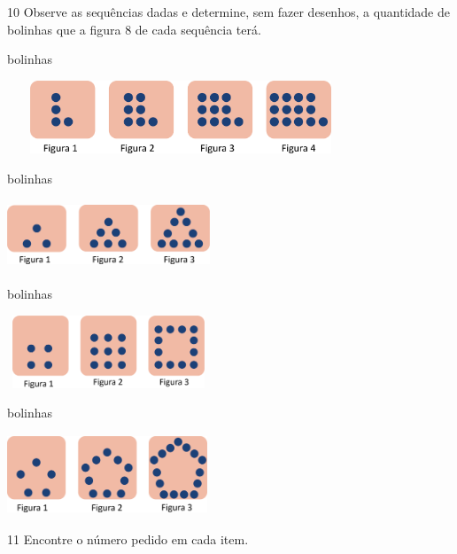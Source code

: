 \num{10} Observe as sequências dadas e determine, sem fazer desenhos, a
quantidade de bolinhas que a figura 8 de cada sequência terá.


\begin{escolha}
\item {} bolinhas

\includegraphics[width=4.09202in,height=0.85841in]{media/image32.png}

\item {} bolinhas

\includegraphics[width=2.38354in,height=0.81674in]{media/image33.png}

\item {} bolinhas

\includegraphics[width=2.38354in,height=0.85007in]{media/image34.png}

\item {} bolinhas

\includegraphics[width=2.35854in,height=0.94175in]{media/image35.png}
\end{escolha}

\num{11} Encontre o número pedido em cada item.

